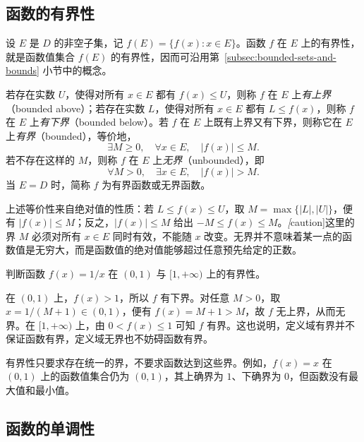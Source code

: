 \subsection{函数的有界性}
\label{subsec:boundedness-of-functions}

设 $E$ 是 $D$ 的非空子集，记 $f(E)=\{f(x):x\in E\}$。函数 $f$ 在 $E$ 上的有界性，就是函数值集合 $f(E)$ 的有界性，因而可沿用第~\ref{subsec:bounded-sets-and-bounds} 小节中的概念。

\begin{definition}
\label{def:bounded-functions}
若存在实数 $U$，使得对所有 $x\in E$ 都有 $f(x)\leq U$，则称 $f$ 在 $E$ 上\emph{有上界}（bounded above）；若存在实数 $L$，使得对所有 $x\in E$ 都有 $L\leq f(x)$，则称 $f$ 在 $E$ 上\emph{有下界}（bounded below）。若 $f$ 在 $E$ 上既有上界又有下界，则称它在 $E$ 上\emph{有界}（bounded），等价地，
\[
    \exists M\geq 0,\quad \forall x\in E,\quad |f(x)|\leq M.
\]
若不存在这样的 $M$，则称 $f$ 在 $E$ 上\emph{无界}（unbounded），即
\[
    \forall M>0,\quad \exists x\in E,\quad |f(x)|>M.
\]
当 $E=D$ 时，简称 $f$ 为有界函数或无界函数。
\end{definition}

上述等价性来自绝对值的性质：若 $L\leq f(x)\leq U$，取 $M=\max\{|L|,|U|\}$，便有 $|f(x)|\leq M$；反之，$|f(x)|\leq M$ 给出 $-M\leq f(x)\leq M$。\emph[caution]{这里的界 $M$ 必须对所有 $x\in E$ 同时有效，不能随 $x$ 改变。}无界并不意味着某一点的函数值是无穷大，而是函数值的绝对值能够超过任意预先给定的正数。

\begin{example}
\label{ex:function-boundedness-domain}
判断函数 $f(x)=1/x$ 在 $(0,1)$ 与 $[1,+\infty)$ 上的有界性。
\end{example}

\begin{solve}
在 $(0,1)$ 上，$f(x)>1$，所以 $f$ 有下界。对任意 $M>0$，取 $x=1/(M+1)\in(0,1)$，便有 $f(x)=M+1>M$，故 $f$ 无上界，从而无界。在 $[1,+\infty)$ 上，由 $0<f(x)\leq 1$ 可知 $f$ 有界。这也说明，定义域有界并不保证函数有界，定义域无界也不妨碍函数有界。
\end{solve}

有界性只要求存在统一的界，不要求函数达到这些界。例如，$f(x)=x$ 在 $(0,1)$ 上的函数值集合仍为 $(0,1)$，其上确界为 $1$、下确界为 $0$，但函数没有最大值和最小值。

\subsection{函数的单调性}
\label{subsec:monotonicity-of-functions}


